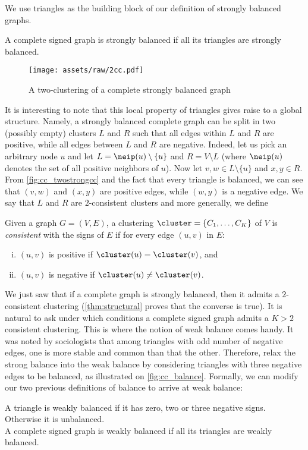 We use triangles as the building block of our definition of strongly balanced graphs.
\begin{definition}
	A complete signed graph is strongly balanced if all its triangles are strongly balanced.
\end{definition}

\begin{wrapfigure}{o}[10mm]{45mm}
  \centering
  \texttt{[image: assets/raw/2cc.pdf]}
  \caption{\small A two-clustering of a complete strongly balanced graph}
  \label{fig:cc_twostrongcc}
\end{wrapfigure}
It is interesting to note that this local property of triangles gives raise to a global structure.
Namely, a strongly balanced complete graph can be split in two (possibly empty) clusters $L$ and $R$
such that all edges within $L$ and $R$ are positive, while all edges between $L$ and $R$ are
negative. Indeed, let us pick an arbitrary node $u$ and let $L=\neip(u)\setminus \{u\}$ and
$R=V\setminus L$ (where $\neip(u)$ denotes the set of all positive neighbors of $u$). Now
let $v,w\in L\setminus \{u\}$ and $x,y\in R$. From \autoref{fig:cc_twostrongcc} and the fact that
every triangle is balanced, we can see that $(v,w)$ and $(x,y)$ are positive edges, while $(w,y)$ is
a negative edge.
We say that $L$ and $R$ are $2$-consistent clusters and more generally, we define
\begin{definition}
  Given a graph $G=(V, E)$, a clustering $\cluster=\{C_1, \ldots, C_K\}$ of $V$ is \emph{consistent}
  with the signs of $E$ if for every edge $(u,v)$ in $E$:
  \begin{enumerate}[(i),nosep]
    \item $(u,v)$ is positive if $\cluster(u)=\cluster(v)$, and
    \item $(u,v)$ is negative if $\cluster(u)\neq\cluster(v)$.
  \end{enumerate}
\end{definition}

We just saw that if a complete graph is strongly balanced, then it admits a $2$-consistent
clustering (\autoref{thm:structural} proves that the converse is true). It is natural to ask under which
conditions a complete signed graph admits a $K>2$ consistent clustering. This is where the notion of
weak balance comes handy. It was noted by
sociologists that among triangles with odd number of negative edges, one is more stable and common
than that the other. Therefore, \textcite{davis1967clustering} relax the strong balance into the
weak balance by considering triangles with three negative edges to be balanced, as illustrated on
\autoref{fig:cc_balance}. Formally, we can modify our two previous definitions of balance to arrive
at weak balance:
\begin{definition}\label{def:weak_balance}
	A triangle is weakly balanced if it has zero, two or three negative signs. Otherwise it is
	unbalanced. \\
	A complete signed graph is weakly balanced if all its triangles are weakly balanced.
\end{definition}

